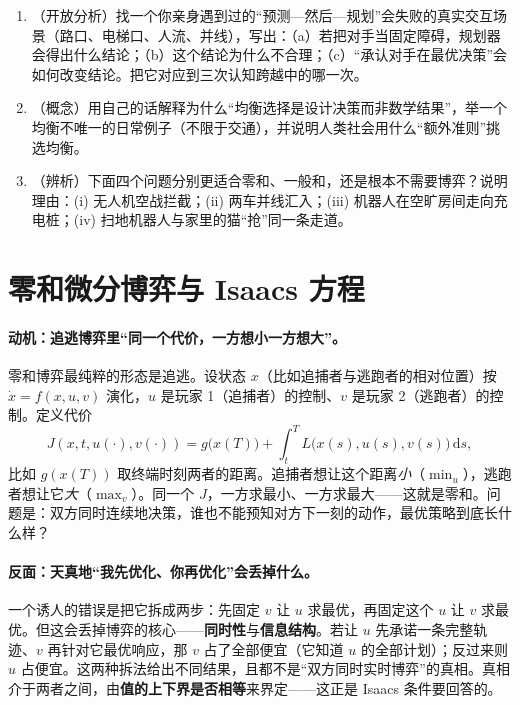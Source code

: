 \begin{practice}
\begin{enumerate}
  \item （开放分析）找一个你亲身遇到过的“预测—然后—规划”会失败的真实交互场景（路口、电梯口、人流、并线），写出：（a）若把对手当固定障碍，规划器会得出什么结论；（b）这个结论为什么不合理；（c）“承认对手在最优决策”会如何改变结论。把它对应到三次认知跨越中的哪一次。
  \item （概念）用自己的话解释为什么“均衡选择是设计决策而非数学结果”，举一个均衡不唯一的日常例子（不限于交通），并说明人类社会用什么“额外准则”挑选均衡。
  \item （辨析）下面四个问题分别更适合零和、一般和，还是根本不需要博弈？说明理由：(i) 无人机空战拦截；(ii) 两车并线汇入；(iii) 机器人在空旷房间走向充电桩；(iv) 扫地机器人与家里的猫“抢”同一条走道。
\end{enumerate}
\end{practice}

\section{零和微分博弈与 Isaacs 方程}
\label{sec:dg-isaacs}

\paragraph{动机：追逃博弈里“同一个代价，一方想小一方想大”。}
零和博弈最纯粹的形态是追逃。设状态 $x$（比如追捕者与逃跑者的相对位置）按 $\dot x=f(x,u,v)$ 演化，$u$ 是玩家 1（追捕者）的控制、$v$ 是玩家 2（逃跑者）的控制。定义代价
\begin{equation}
  J(x,t,u(\cdot),v(\cdot))=g\big(x(T)\big)+\int_t^T L\big(x(s),u(s),v(s)\big)\,\mathrm ds,
  \label{eq:dg-cost}
\end{equation}
比如 $g(x(T))$ 取终端时刻两者的距离。追捕者想让这个距离\emph{小}（$\min_u$），逃跑者想让它\emph{大}（$\max_v$）。同一个 $J$，一方求最小、一方求最大——这就是零和。问题是：双方同时连续地决策，谁也不能预知对方下一刻的动作，最优策略到底长什么样？

\paragraph{反面：天真地“我先优化、你再优化”会丢掉什么。}
一个诱人的错误是把它拆成两步：先固定 $v$ 让 $u$ 求最优，再固定这个 $u$ 让 $v$ 求最优。但这会丢掉博弈的核心——\textbf{同时性}与\textbf{信息结构}。若让 $u$ 先承诺一条完整轨迹、$v$ 再针对它最优响应，那 $v$ 占了全部便宜（它知道 $u$ 的全部计划）；反过来则 $u$ 占便宜。这两种拆法给出不同结果，且都不是“双方同时实时博弈”的真相。真相介于两者之间，由\textbf{值的上下界是否相等}来界定——这正是 Isaacs 条件要回答的。

